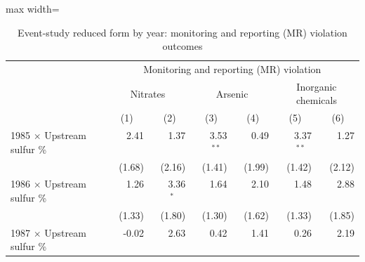 \begin{table}[htbp]
\raggedright
\begin{minipage}{\linewidth}
\caption{\label{tab:es_rf_coefs_mr_k2} Event-study reduced form by year: monitoring and reporting (MR) violation outcomes}
\end{minipage}
\small
{\setlength{\tabcolsep}{4pt}%
\begin{adjustbox}{max width=\linewidth}
\begin{tabular}{lrrrrrr}
\toprule
 & \multicolumn{6}{c}{Monitoring and reporting (MR) violation} \\
 & \multicolumn{2}{c}{Nitrates} & \multicolumn{2}{c}{Arsenic} & \multicolumn{2}{c}{Inorganic chemicals} \\
 & \multicolumn{1}{c}{(1)} & \multicolumn{1}{c}{(2)} & \multicolumn{1}{c}{(3)} & \multicolumn{1}{c}{(4)} & \multicolumn{1}{c}{(5)} & \multicolumn{1}{c}{(6)} \\
\hline
1985 $\times$ Upstream sulfur \% & \phantom{(}\phantom{-}2.41$^{\phantom{*}\phantom{*}\phantom{*}}$ & \phantom{(}\phantom{-}1.37$^{\phantom{*}\phantom{*}\phantom{*}}$ & \phantom{(}\phantom{-}3.53$^{**\phantom{*}}$ & \phantom{(}\phantom{-}0.49$^{\phantom{*}\phantom{*}\phantom{*}}$ & \phantom{(}\phantom{-}3.37$^{**\phantom{*}}$ & \phantom{(}\phantom{-}1.27$^{\phantom{*}\phantom{*}\phantom{*}}$ \\
 & (\phantom{-}1.68)\phantom{$^{***}$} & (\phantom{-}2.16)\phantom{$^{***}$} & (\phantom{-}1.41)\phantom{$^{***}$} & (\phantom{-}1.99)\phantom{$^{***}$} & (\phantom{-}1.42)\phantom{$^{***}$} & (\phantom{-}2.12)\phantom{$^{***}$} \\
1986 $\times$ Upstream sulfur \% & \phantom{(}\phantom{-}1.26$^{\phantom{*}\phantom{*}\phantom{*}}$ & \phantom{(}\phantom{-}3.36$^{*\phantom{*}\phantom{*}}$ & \phantom{(}\phantom{-}1.64$^{\phantom{*}\phantom{*}\phantom{*}}$ & \phantom{(}\phantom{-}2.10$^{\phantom{*}\phantom{*}\phantom{*}}$ & \phantom{(}\phantom{-}1.48$^{\phantom{*}\phantom{*}\phantom{*}}$ & \phantom{(}\phantom{-}2.88$^{\phantom{*}\phantom{*}\phantom{*}}$ \\
 & (\phantom{-}1.33)\phantom{$^{***}$} & (\phantom{-}1.80)\phantom{$^{***}$} & (\phantom{-}1.30)\phantom{$^{***}$} & (\phantom{-}1.62)\phantom{$^{***}$} & (\phantom{-}1.33)\phantom{$^{***}$} & (\phantom{-}1.85)\phantom{$^{***}$} \\
1987 $\times$ Upstream sulfur \% & \phantom{(}-0.02$^{\phantom{*}\phantom{*}\phantom{*}}$ & \phantom{(}\phantom{-}2.63$^{\phantom{*}\phantom{*}\phantom{*}}$ & \phantom{(}\phantom{-}0.42$^{\phantom{*}\phantom{*}\phantom{*}}$ & \phantom{(}\phantom{-}1.41$^{\phantom{*}\phantom{*}\phantom{*}}$ & \phantom{(}\phantom{-}0.26$^{\phantom{*}\phantom{*}\phantom{*}}$ & \phantom{(}\phantom{-}2.19$^{\phantom{*}\phantom{*}\phantom{*}}$ \\

\end{tabular}
\end{adjustbox}}
\end{table}
